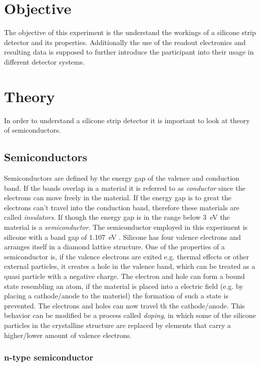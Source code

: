 \section{Objective}
\label{sec:Obj}
The objective of this experiment is the understand the workings of a silicone strip detector and its properties. Additionally the use of the readout electronics and resulting data is supposed to further introduce the participant into their usage in different detector systems.
\section{Theory}
\label{sec:Theo}

In order to understand a silicone strip detector it is important to look at theory of semiconductors.
\subsection{Semiconductors}
Semiconductors are defined by the energy gap of the valence and conduction band. If the bands overlap in a material it is referred to as \textit{conductor} since the electrons can move freely in the material. If the energy gap is to great the electrons can't travel into the conduction band, therefore these materials are called \textit{insulators}. If though the energy gap is in the range below \qty{3}{\eV} the material is a \textit{semiconductor}. The semiconductor employed in this experiment is silicone with a band gap of \qty{1.107}{\eV} \cite{V15}. Silicone has four valence electrons and arranges itself in a diamond lattice structure. One of the properties of a semiconductor is, if the valence electrons are exited e.g. thermal effects or other external particles, it creates a hole in the valence band, which can be treated as a quasi particle with a negative charge. The electron and hole can form a bound state resembling an atom, if the material is placed into a electric field (e.g. by placing a cathode/anode to the materiel) the formation of such a state is prevented. The electrons and holes can now travel th the cathode/anode. This behavior can be modified be a process called \textit{doping}, in which some of the silicone particles in the crystalline structure are replaced by elements that carry a higher/lower amount of valence electrons. %

\subsubsection{n-type semiconductor}

